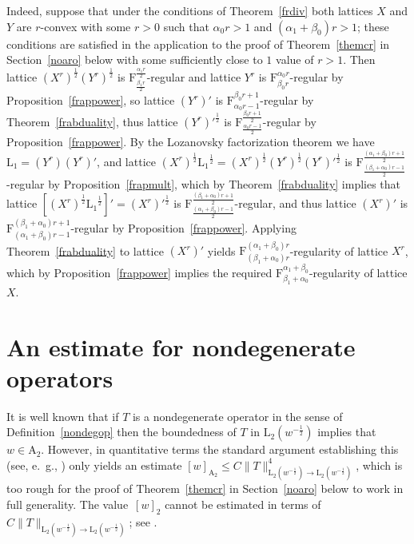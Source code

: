 \documentclass[12pt]{amsart}
\newcommand {\apclass} [1] {\ensuremath{\mathrm A_{#1}}}
\newcommand {\frclass} [2] {\ensuremath{\mathrm F^{#1}_{#2}}}
\newcommand {\lclass} [2] {\ensuremath{\mathrm L_{#1} \left( #2 \right) }}
\newcommand {\lclassg} [1] {\ensuremath{\mathrm L_{#1}}}
\newcommand {\weightw} {\ensuremath {\mathit w}}
\begin{document}
Indeed, suppose that under the conditions of Theorem~\ref {frdiv} both lattices $X$ and $Y$ are
$r$-convex with some $r > 0$ such that $\alpha_0 r > 1$ and $(\alpha_1 + \beta_0) r > 1$;
these conditions are satisfied
in the application to the proof of Theorem~\ref {themcr} in Section~\ref {noaro} below
with some sufficiently close to $1$ value of $r > 1$.
Then lattice $(X^r)^{\frac 1 2} (Y^r)^{\frac 1 2}$ is $\frclass {\frac {\alpha_1 r} 2} {\frac {\beta_1 r} 2}$-regular
and lattice $Y^r$ is $\frclass {\alpha_0 r} {\beta_0 r}$-regular
by Proposition~\ref {frappower}, so lattice $(Y^r)'$ is $\frclass {\beta_0 r + 1} {\alpha_0 r - 1}$-regular
by Theorem~\ref {frabduality}, thus lattice $(Y^r)'^{\frac 1 2}$ is
$\frclass {\frac {\beta_0 r + 1} 2} {\frac {\alpha_0 r - 1} 2}$-regular by Proposition~\ref {frappower}.
By the Lozanovsky factorization theorem \cite {lozanovsky1969} we have
$\lclassg {1} = (Y^r) (Y^r)'$,
and lattice $(X^r)^{\frac 1 2} \lclassg {1}^{\frac 1 2} = (X^r)^{\frac 1 2} (Y^r)^{\frac 1 2} (Y^r)'^{\frac 1 2}$
is $\frclass {\frac {(\alpha_1 + \beta_0) r + 1} 2} {\frac {(\beta_1 + \alpha_0) r - 1} 2}$-regular by 
Proposition~\ref {frapmult}, which by Theorem~\ref {frabduality} implies that
lattice
$\left[(X^r)^{\frac 1 2} \lclassg {1}^{\frac 1 2}\right]' = (X^r)'^{\frac 1 2}$ is
$\frclass {\frac {(\beta_1 + \alpha_0) r + 1} 2} {\frac {(\alpha_1 + \beta_0) r - 1} 2}$-regular,
and thus lattice $(X^r)'$ is $\frclass {(\beta_1 + \alpha_0) r + 1} {(\alpha_1 + \beta_0) r - 1}$-regular
by Proposition~\ref {frappower}.  Applying Theorem~\ref {frabduality} to lattice $(X^r)'$ yields
$\frclass {(\alpha_1 + \beta_0) r} {(\beta_1 + \alpha_0) r}$-regularity of lattice $X^r$,
which by Proposition~\ref {frappower} implies the required
$\frclass {\alpha_1 + \beta_0} {\beta_1 + \alpha_0}$-regularity of lattice $X$.

\section {An estimate for nondegenerate operators}

\label {apono}

It is well known that if $T$ is a nondegenerate operator in the sense of Definition~\ref {nondegop}
then the boundedness of $T$ in $\lclass {2} {\weightw^{-\frac 1 2}}$ implies that $\weightw \in \apclass {2}$.
However, in quantitative terms
the standard argument establishing this (see, e.~g., \cite [Chapter~5, \S 4.6] {stein1993})
only yields an estimate
$[\weightw]_{\apclass {2}} \leqslant C \|T\|_{\lclass {2} {\weightw^{-\frac 1 2}} \to \lclass {2} {\weightw^{-\frac 1 2}}}^4$,
which is too rough for the proof of Theorem~\ref {themcr} in Section~\ref {noaro} below to work in full generality.
The value~$[\weightw]_{2}$ cannot be estimated
in terms of $C \|T\|_{\lclass {2} {\weightw^{-\frac 1 2}} \to \lclass {2} {\weightw^{-\frac 1 2}}}$; see \cite [\S 8.B] {hytonenperez2013}.
\end{document}
